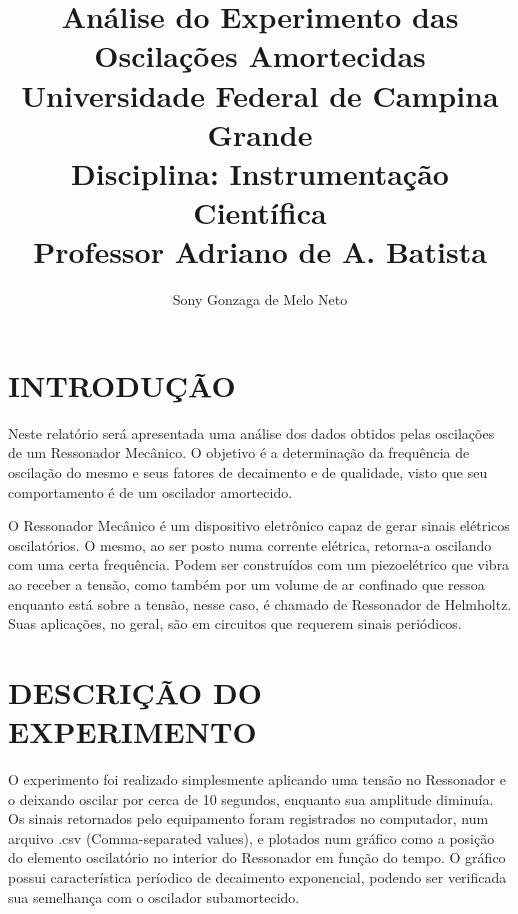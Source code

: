 \documentclass[10pt,a4paper,twocolumn]{article}
\author{Sony Gonzaga de Melo Neto}
\title{Análise do Experimento das Oscilações Amortecidas\\
\large Universidade Federal de Campina Grande \\
  Disciplina: Instrumentação Científica \\
  Professor Adriano de A. Batista}
\begin{document}
\maketitle
\section{INTRODUÇÃO}
Neste relatório será apresentada uma análise dos dados obtidos pelas oscilações de um Ressonador Mecânico. O objetivo é a determinação da frequência de oscilação do mesmo e seus fatores de decaimento e de qualidade, visto que seu comportamento é de um oscilador amortecido.\\
\par O Ressonador Mecânico é um dispositivo eletrônico capaz de gerar sinais elétricos oscilatórios. O mesmo, ao ser posto numa corrente elétrica, retorna-a oscilando com uma certa frequência. Podem ser construídos com um piezoelétrico que vibra ao receber a tensão, como também por um volume de ar confinado que ressoa enquanto está sobre a tensão, nesse caso, é chamado de Ressonador de Helmholtz. Suas aplicações, no geral, são em circuitos que requerem sinais periódicos.
\section{DESCRIÇÃO DO EXPERIMENTO}
O experimento foi realizado simplesmente aplicando uma tensão no Ressonador e o deixando oscilar por cerca de 10 segundos, enquanto sua amplitude diminuía. Os sinais retornados pelo equipamento foram registrados no computador, num arquivo .csv (Comma-separated values), e plotados num gráfico como a posição do elemento oscilatório no interior do Ressonador em função do tempo. O gráfico possui característica períodico de decaimento exponencial, podendo ser verificada sua semelhança com o oscilador subamortecido.
\end{document}
